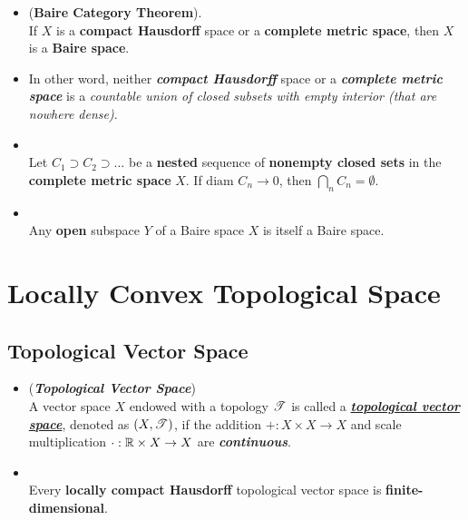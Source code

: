 \documentclass[11pt]{article}
\begin{document}
\begin{itemize}
\item \begin{theorem} (\textbf{Baire Category Theorem}).  \citep{munkres2000topology} \\
If $X$ is a \textbf{compact Hausdorff} space or a \textbf{complete metric space}, then $X$ is a \textbf{Baire space}.
\end{theorem}

\item \begin{remark}
In other word,  neither \textbf{\emph{compact Hausdorff}} space or a \textbf{\emph{complete metric space}} is a \emph{countable union of closed subsets with empty interior (that are nowhere dense)}.
\end{remark}

\item \begin{lemma}\citep{munkres2000topology} \\
Let $C_1 \supset C_2 \supset \ldots$ be a \textbf{nested} sequence of \textbf{nonempty closed sets} in the \textbf{complete metric space} $X$. If $\text{diam }C_n \rightarrow 0$, then $\bigcap_{n}C_n  = \emptyset$.
\end{lemma}

\item \begin{lemma} \citep{munkres2000topology} \\
Any \textbf{open} subspace $Y$ of a Baire space $X$ is itself a Baire space.
\end{lemma}
\end{itemize}


\section{Locally Convex Topological Space}
\subsection{Topological Vector Space}
\begin{itemize}
\item \begin{definition} (\emph{\textbf{Topological Vector Space}})\\
A vector space $X$ endowed with a topology ${\mathscr T}$ is called a \underline{\emph{\textbf{topological vector space}}}, denoted as $(X, {\mathscr T})$, if the addition $+: X\times X \rightarrow X$ and scale multiplication $\cdot: {\mathbb R}\times X \rightarrow X$ are \emph{\textbf{continuous}}. 
\end{definition}

 \item \begin{theorem} \citep{treves2016topological}\\
 Every \textbf{locally compact Hausdorff} topological vector space is \textbf{finite-dimensional}.
 \end{theorem}
\end{itemize}
\end{document}
